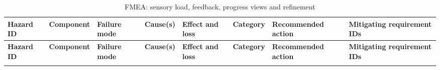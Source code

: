 \documentclass{article}
\newenvironment{fmealandscape}{
    \begin{landscape}
    \pagestyle{empty}
    \AddToShipoutPictureFG{ \AtPageLowerLeft{
        \put(\LenToUnit{\dimexpr\paperwidth-1.5cm\relax},
        \LenToUnit{.5\paperheight}){ \makebox(0,0)[c]{\rotatebox{90}{\thepage}}
        } } } }{
    \end{landscape}
    \ClearShipoutPictureFG }
\begin{document}
\begin{fmealandscape}
{\footnotesize
\setlength{\tabcolsep}{2pt}
\begin{longtable}{@{}
  >{\raggedright\arraybackslash}p{1.85cm} >{\raggedright\arraybackslash}p{1.8cm}
  >{\raggedright\arraybackslash}p{2.4cm} >{\raggedright\arraybackslash}p{2.3cm}
  >{\raggedright\arraybackslash}p{2.6cm} >{\raggedright\arraybackslash}p{1.9cm}
  >{\raggedright\arraybackslash}p{3.4cm}
  >{\raggedright\arraybackslash}p{2.0cm}@{}}
\caption{FMEA: sensory load, feedback, progress views and refinement}
\label{tab:fmea-mou}\\
\toprule
\textbf{Hazard ID} & \textbf{Component} & \textbf{Failure mode} &
\textbf{Cause(s)} & \textbf{Effect and loss} & \textbf{Category} &
\textbf{Recommended action} & \textbf{Mitigating requirement IDs} \\
\midrule
\endfirsthead
\toprule
\textbf{Hazard ID} & \textbf{Component} & \textbf{Failure mode} &
\textbf{Cause(s)} & \textbf{Effect and loss} & \textbf{Category} &
\textbf{Recommended action} & \textbf{Mitigating requirement IDs} \\
\midrule
\endhead
\bottomrule
\endlastfoot


\end{longtable}}
\end{fmealandscape}
\end{document}
